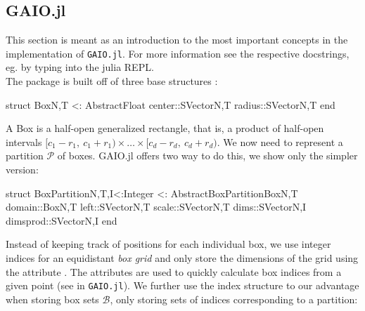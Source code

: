
\subsection{GAIO.jl}

This section is meant as an introduction to the most important concepts in the implementation of 
\texttt{GAIO.jl}. For more information see the respective docstrings, eg. by typing 
 into the julia REPL.\\

The package is built off of three base structures :

\begin{minipage}{\linewidth}
\begin{jllisting}[language=julia, style=jlcodestyle]
    struct Box{N,T <: AbstractFloat}
        center::SVector{N,T}
        radius::SVector{N,T}
    end
\end{jllisting}
\end{minipage}

A Box is a half-open generalized rectangle, that is, a product of half-open intervals
$[c_1 - r_1,\ c_1 + r_1) \times \ldots \times [c_d - r_d,\ c_d + r_d)$. We now 
need to represent a partition $\mathcal{P}$ of boxes. GAIO.jl offers two way to do this, 
we show only the simpler version: 

\begin{minipage}{\linewidth}
\begin{jllisting}[language=julia, style=jlcodestyle]
    struct BoxPartition{N,T,I<:Integer} <: AbstractBoxPartition{Box{N,T}}
        domain::Box{N,T}
        left::SVector{N,T}
        scale::SVector{N,T}
        dims::SVector{N,I}
        dimsprod::SVector{N,I}
    end
\end{jllisting}
\end{minipage}

Instead of keeping track of positions for each individual box, we use integer indices 
for an equidistant \emph{box grid} and only store the dimensions of the grid using 
the attribute . The attributes  are used to 
quickly calculate box indices from a given point (see  
in \texttt{GAIO.jl}). We further use the index structure to our advantage when storing 
box sets $\mathcal{B}$, only storing sets of indices corresponding to a partition:

